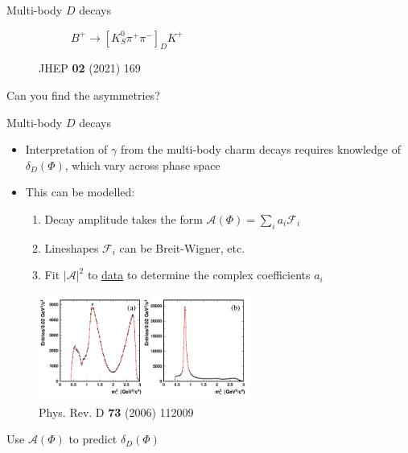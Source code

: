 \documentclass[dvipsnames]{beamer}
\begin{document}
\begin{frame}{Multi-body $D$ decays}
\begin{figure}
\begin{subfigure}{0.5\textwidth}
      \vspace{-0.8cm}
      \caption*{$B^+\to[K_S^0\pi^+\pi^-]_DK^+$}
    \end{subfigure}
    \vspace{-0.3cm}
    \caption*{\tiny JHEP \textbf{02} (2021) 169}
  \end{figure}
  \vspace{-0.6cm}
  \begin{center}
    \Large Can you find the asymmetries?
  \end{center}
\end{frame}

\begin{frame}{Multi-body $D$ decays}
  \begin{itemize}
    \setlength\itemsep{0.5em}
    \item{Interpretation of $\gamma$ from the multi-body charm decays requires knowledge of $\delta_D(\Phi)$, which vary across phase space}
    \item{This can be modelled:}
    \begin{enumerate}
      \item{Decay amplitude takes the form $\mathcal{A}(\Phi) = \sum_ia_i\mathcal{F}_i$}
      \item{Lineshapes $\mathcal{F}_i$ can be Breit-Wigner, etc.}
      \item{Fit $\lvert\mathcal{A}\rvert^2$ to \underline{data} to determine the complex coefficients $a_i$}
    \end{enumerate}
  \end{itemize}
  \begin{figure}
    \centering
    \includegraphics[height = 3.5cm]{Plots/ds2dpi1.pdf}
    \vspace{-0.4cm}
    \caption*{\tiny Phys. Rev. D \textbf{73} (2006) 112009}
  \end{figure}
  \vspace{-0.6cm}
  \begin{center}
    Use $\mathcal{A}(\Phi)$ to predict $\delta_D(\Phi)$
  \end{center}
\end{frame}
\end{document}
